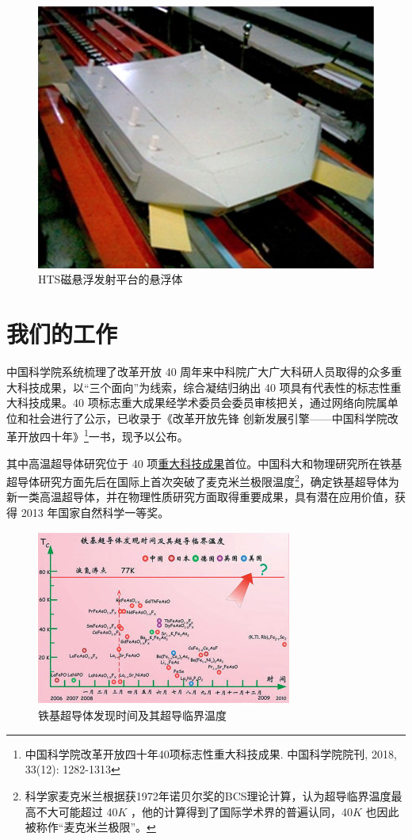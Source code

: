 \documentclass[UTF8, twocolumn]{ctexart}
\begin{document}
    \begin{figure}[ht]
        \centering
        \includegraphics[scale=0.8]{image/pan2010.jpg}
        \caption{HTS磁悬浮发射平台的悬浮体}
        \label{fig:image3}
    \end{figure}

\section{我们的工作}

    中国科学院系统梳理了改革开放 40 周年来中科院广大广大科研人员取得的众多重大科技成果，以“三个面向”为线索，综合凝结归纳出 40 项具有代表性的标志性重大科技成果。40 项标志重大成果经学术委员会委员审核把关，通过网络向院属单位和社会进行了公示，已收录于《改革开放先锋 创新发展引擎——中国科学院改革开放四十年》\footnote{中国科学院改革开放四十年40项标志性重大科技成果. 中国科学院院刊, 2018, 33(12): 1282-1313}一书，现予以公布。
    
    其中高温超导体研究位于 40 项\href{http://www.bulletin.cas.cn/publish_article/2018/12/20181202.htm}{重大科技成果}首位。中国科大和物理研究所在铁基超导体研究方面先后在国际上首次突破了麦克米兰极限温度\footnote{科学家麦克米兰根据获1972年诺贝尔奖的BCS理论计算，认为超导临界温度最高不大可能超过 40$K$ ，他的计算得到了国际学术界的普遍认同，40$K$ 也因此被称作“麦克米兰极限”。}，确定铁基超导体为新一类高温超导体，并在物理性质研究方面取得重要成果，具有潜在应用价值，获得 2013 年国家自然科学一等奖。

    \begin{figure}[h]
        \centering
        \includegraphics[scale=0.8]{image/铁基超导体.jpg}
        \caption{铁基超导体发现时间及其超导临界温度}
        \label{fig:image3}
    \end{figure}
\end{document}
